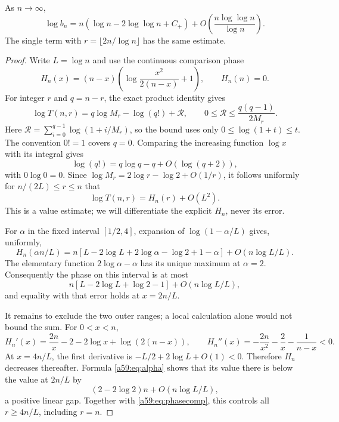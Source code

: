 \documentclass[11pt,letterpaper]{article}
\theoremstyle{remark}\newtheorem{remark}[theorem]{Remark}
\theoremstyle{remark}\newtheorem{wremark}{Remark}\renewcommand{\thewremark}{W\arabic{wremark}}
\theoremstyle{plain}\newtheorem{wcorollary}[wremark]{Corollary}
\begin{document}
\begin{lemma}\label{a59:lem:triangular}
As $n\to\infty$,
\begin{equation}\label{a59:eq:blog}
 \log b_n=n(\log n-2\log\log n+C_+)
       +O\!\left(\frac{n\log\log n}{\log n}\right).
\end{equation}
The single term with $r=\lfloor2n/\log n\rfloor$ has the same estimate.
\end{lemma}
\begin{proof}
Write $L=\log n$ and use the continuous comparison phase
\[
 H_n(x)=(n-x)\left(\log\frac{x^2}{2(n-x)}+1\right),
 \qquad H_n(n)=0.
\]
For integer $r$ and $q=n-r$, the exact product identity gives
\begin{equation}\label{a59:eq:product}
 \log T(n,r)=q\log M_r-\log(q!)+\mathcal R,
 \qquad 0\le\mathcal R\le\frac{q(q-1)}{2M_r}.
\end{equation}
Here $\mathcal R=\sum_{i=0}^{q-1}\log(1+i/M_r)$, so the bound uses only $0\le\log(1+t)\le t$. The convention $0!=1$ covers $q=0$. Comparing the increasing function $\log x$ with its integral gives
\[
 \log(q!)=q\log q-q+O(\log(q+2)),
\]
with $0\log0=0$. Since $\log M_r=2\log r-\log2+O(1/r)$, it follows uniformly for $n/(2L)\le r\le n$ that
\begin{equation}\label{a59:eq:phasecomp}
 \log T(n,r)=H_n(r)+O(L^2).
\end{equation}
This is a value estimate; we will differentiate the explicit $H_n$, never its error.

For $\alpha$ in the fixed interval $[1/2,4]$, expansion of $\log(1-\alpha/L)$ gives, uniformly,
\begin{equation}\label{a59:eq:alpha}
 H_n(\alpha n/L)
 =n\left[L-2\log L+2\log\alpha-\log2+1-\alpha\right]
     +O(n\log L/L).
\end{equation}
The elementary function $2\log\alpha-\alpha$ has its unique maximum at $\alpha=2$. Consequently the phase on this interval is at most
\[
 n[L-2\log L+\log2-1]+O(n\log L/L),
\]
and equality with that error holds at $x=2n/L$.

It remains to exclude the two outer ranges; a local calculation alone would not bound the sum. For $0<x<n$,
\[
 H_n'(x)=\frac{2n}{x}-2-2\log x+\log(2(n-x)),\qquad
 H_n''(x)=-\frac{2n}{x^2}-\frac2x-\frac1{n-x}<0.
\]
At $x=4n/L$, the first derivative is $-L/2+2\log L+O(1)<0$. Therefore $H_n$ decreases thereafter. Formula \eqref{a59:eq:alpha} shows that its value there is below the value at $2n/L$ by
\[
 (2-2\log2)n+O(n\log L/L),
\]
a positive linear gap. Together with \eqref{a59:eq:phasecomp}, this controls all $r\ge4n/L$, including $r=n$.


\end{proof}
\end{document}

